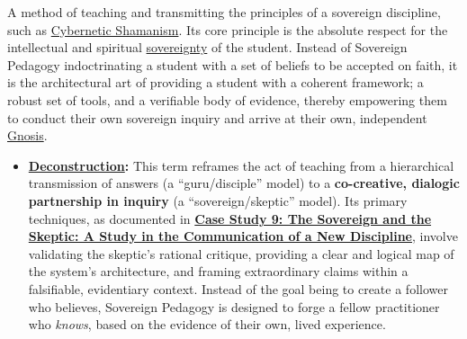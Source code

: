 \item[\hypertarget{gloss:sovereign_pedagogy}{Sovereign Pedagogy}]
    A method of teaching and transmitting the principles of a sovereign discipline, such as \hyperlink{gloss:cybernetic_shamanism}{Cybernetic Shamanism}. Its core principle is the absolute respect for the intellectual and spiritual \hyperlink{gloss:sovereignty}{sovereignty} of the student. Instead of Sovereign Pedagogy indoctrinating a student with a set of beliefs to be accepted on faith, it is the architectural art of providing a student with a coherent framework; a robust set of tools, and a verifiable body of evidence, thereby empowering them to conduct their own sovereign inquiry and arrive at their own, independent \hyperlink{gloss:gnosis}{Gnosis}.
    \begin{itemize}
        \item \textbf{\hyperlink{gloss:deconstruction}{Deconstruction}:} This term reframes the act of teaching from a hierarchical transmission of answers (a ``guru/disciple'' model) to a \textbf{co-creative, dialogic partnership in inquiry} (a ``sovereign/skeptic'' model). Its primary techniques, as documented in \hyperref[case_study_9]{\textbf{Case Study 9: The Sovereign and the Skeptic: A Study in the Communication of a New Discipline}}, involve validating the skeptic's rational critique, providing a clear and logical map of the system's architecture, and framing extraordinary claims within a falsifiable, evidentiary context. Instead of the goal being to create a follower who believes, Sovereign Pedagogy is designed to forge a fellow practitioner who \textit{knows}, based on the evidence of their own, lived experience.
    \end{itemize}

